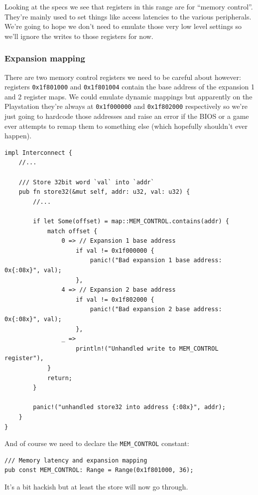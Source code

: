 \documentclass[a4paper]{article}
\newcommand{\code}[1] {\texttt{#1}}
\begin{document}
Looking at the specs we see that registers in this range are for
``memory control''. They're mainly used to set things like access
latencies to the various peripherals. We're going to hope we don't
need to emulate those very low level settings so we'll ignore the
writes to those registers for now.

\subsubsection{Expansion mapping}

There are two memory control registers we need to be careful about
however: registers \code{0x1f801000} and \code{0x1f801004} contain
the base address of the expansion 1 and 2 register maps. We could
emulate dynamic mappings but apparently on the Playstation they're
always at \code{0x1f000000} and \code{0x1f802000} respectively so
we're just going to hardcode those addresses and raise an error if the
BIOS or a game ever attempts to remap them to something else (which
hopefully shouldn't ever happen).

\begin{lstlisting}
impl Interconnect {
    //...

    /// Store 32bit word `val` into `addr`
    pub fn store32(&mut self, addr: u32, val: u32) {
        //...

        if let Some(offset) = map::MEM_CONTROL.contains(addr) {
            match offset {
                0 => // Expansion 1 base address
                    if val != 0x1f000000 {
                        panic!("Bad expansion 1 base address: 0x{:08x}", val);
                    },
                4 => // Expansion 2 base address
                    if val != 0x1f802000 {
                        panic!("Bad expansion 2 base address: 0x{:08x}", val);
                    },
                _ =>
                    println!("Unhandled write to MEM_CONTROL register"),
            }
            return;
        }

        panic!("unhandled store32 into address {:08x}", addr);
    }
}
\end{lstlisting}

And of course we need to declare the \code{MEM\_CONTROL} constant:

\begin{lstlisting}
/// Memory latency and expansion mapping
pub const MEM_CONTROL: Range = Range(0x1f801000, 36);
\end{lstlisting}

It's a bit hackish but at least the store will now go through.
\end{document}
